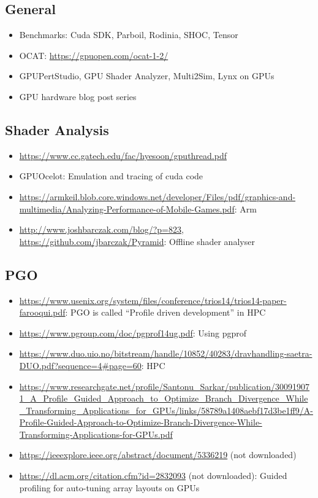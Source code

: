 \clearpage
{}
\label{sec:references}

\subsection{General}
\begin{itemize}
	\item Benchmarks: Cuda SDK, Parboil, Rodinia, SHOC, Tensor
	\item OCAT: \url{https://gpuopen.com/ocat-1-2/}
	\item GPUPertStudio, GPU Shader Analyzer, Multi2Sim, Lynx on GPUs
	\item GPU hardware blog post series~\cite{Chajdas2018}
\end{itemize}

\subsection{Shader Analysis}
\begin{sloppypar}
\begin{itemize}
	\item \url{https://www.cc.gatech.edu/fac/hyesoon/gputhread.pdf}
	\item GPUOcelot: Emulation and tracing of cuda code
	\item \url{https://armkeil.blob.core.windows.net/developer/Files/pdf/graphics-and-multimedia/Analyzing-Performance-of-Mobile-Games.pdf}: Arm
	\item \url{http://www.joshbarczak.com/blog/?p=823}, \url{https://github.com/jbarczak/Pyramid}: Offline shader analyser
\end{itemize}
\end{sloppypar}

\subsection{PGO}
\begin{sloppypar}
\begin{itemize}
	\item \url{https://www.usenix.org/system/files/conference/trios14/trios14-paper-farooqui.pdf}: PGO is called \enquote{Profile driven development} in HPC
	\item \url{https://www.pgroup.com/doc/pgprof14ug.pdf}: Using pgprof
	\item \url{https://www.duo.uio.no/bitstream/handle/10852/40283/dravhandling-saetra-DUO.pdf?sequence=4#page=60}: HPC
	\item \url{https://www.researchgate.net/profile/Santonu_Sarkar/publication/300919071_A_Profile_Guided_Approach_to_Optimize_Branch_Divergence_While_Transforming_Applications_for_GPUs/links/58789a1408aebf17d3be1ff9/A-Profile-Guided-Approach-to-Optimize-Branch-Divergence-While-Transforming-Applications-for-GPUs.pdf}
	\item \url{https://ieeexplore.ieee.org/abstract/document/5336219} (not downloaded)
	\item \url{https://dl.acm.org/citation.cfm?id=2832093} (not downloaded): Guided profiling for auto-tuning array layouts on GPUs
\end{itemize}
\end{sloppypar}